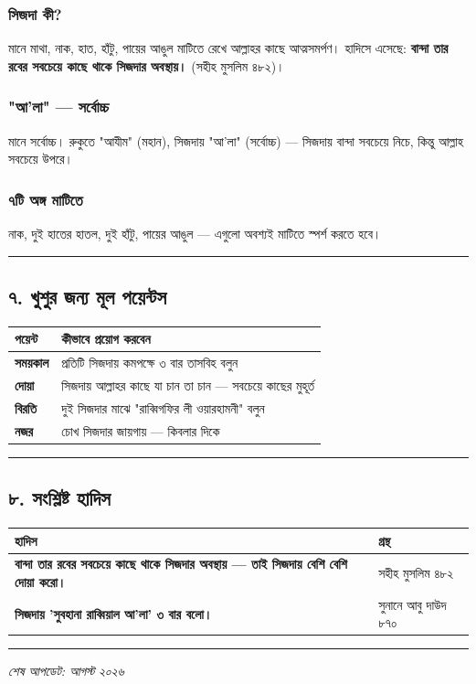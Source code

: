\subsubsection*{\textbf{সিজদা কী?}}
 মানে মাথা, নাক, হাত, হাঁটু, পায়ের আঙুল মাটিতে রেখে আল্লাহর কাছে আত্মসমর্পণ। হাদিসে এসেছে: \textbf{বান্দা তার রবের সবচেয়ে কাছে থাকে সিজদার অবস্থায়।} (সহীহ মুসলিম ৪৮২)।

\subsubsection*{\textbf{"আ'লা" — সর্বোচ্চ}}
 মানে সর্বোচ্চ। রুকুতে "আযীম" (মহান), সিজদায় "আ'লা" (সর্বোচ্চ) — সিজদায় বান্দা সবচেয়ে নিচে, কিন্তু আল্লাহ সবচেয়ে উপরে।

\subsubsection*{\textbf{৭টি অঙ্গ মাটিতে}}
নাক, দুই হাতের হাতল, দুই হাঁটু, পায়ের আঙুল — এগুলো অবশ্যই মাটিতে স্পর্শ করতে হবে।

\medskip\hrule\medskip

\subsection*{৭. খুশুর জন্য মূল পয়েন্টস}

\begin{table}[h]\centering\small
\begin{tabular}{ll}
পয়েন্ট & কীভাবে প্রয়োগ করবেন \\
\hline
\textbf{সময়কাল} & প্রতিটি সিজদায় কমপক্ষে ৩ বার তাসবিহ বলুন \\
\textbf{দোয়া} & সিজদায় আল্লাহর কাছে যা চান তা চান — সবচেয়ে কাছের মুহূর্ত \\
\textbf{বিরতি} & দুই সিজদার মাঝে "রাব্বিগফির লী ওয়ারহামনী" বলুন \\
\textbf{নজর} & চোখ সিজদার জায়গায় — কিবলার দিকে \\
\hline
\end{tabular}
\end{table}

\medskip\hrule\medskip

\subsection*{৮. সংশ্লিষ্ট হাদিস}

\begin{table}[h]\centering\small
\begin{tabular}{ll}
হাদিস & গ্রন্থ \\
\hline
\textbf{\lat{“}বান্দা তার রবের সবচেয়ে কাছে থাকে সিজদার অবস্থায় — তাই সিজদায় বেশি বেশি দোয়া করো।\lat{”}} & সহীহ মুসলিম ৪৮২ \\
\textbf{\lat{“}সিজদায় 'সুবহানা রাব্বিয়াল আ'লা' ৩ বার বলো।\lat{”}} & সুনানে আবু দাউদ ৮৭০ \\
\hline
\end{tabular}
\end{table}

\medskip\hrule\medskip

\textit{শেষ আপডেট: আগস্ট ২০২৬}


